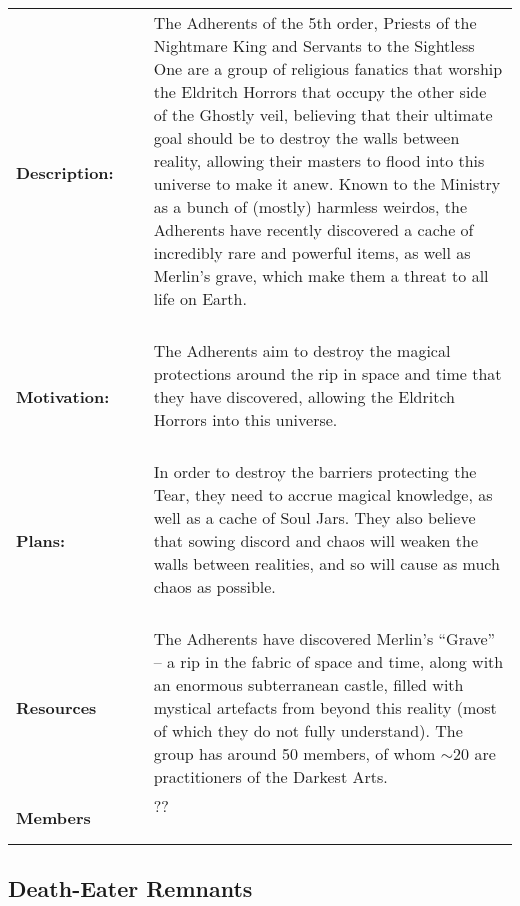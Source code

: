 \documentclass[oneside]{book}
\begin{document}
\begin{longtable}{p{} p{} p{} }

\bf Description: & ~ &\parbox[t]{\q cm}{The Adherents of the 5th order, Priests of the Nightmare King and Servants to the Sightless One are a group of religious fanatics that worship the Eldritch Horrors that occupy the other side of the Ghostly veil, believing that their ultimate goal should be to destroy the walls between reality, allowing their masters to flood into this universe to make it anew. Known to the Ministry as a bunch of (mostly) harmless weirdos, the Adherents have recently discovered a cache of incredibly rare and powerful items, as well as Merlin's grave, which make them a threat to all life on Earth.  \\~  } 
\\
\bf Motivation:	& ~ & \parbox[t]{\q cm}{ The Adherents aim to destroy the magical protections around the rip in space and time that they have discovered, allowing the Eldritch Horrors into this universe.  \\~  } 
\\
\bf Plans:	& ~ & \parbox[t]{\q cm}{In order to destroy the barriers protecting the Tear, they need to accrue magical knowledge, as well as a cache of Soul Jars. They also believe that sowing discord and chaos will weaken the walls between realities, and so will cause as much chaos as possible.\\~  } 
\\
\bf Resources & ~ & \parbox[t]{\q cm}{The Adherents have discovered Merlin's ``Grave'' -- a rip in the fabric of space and time, along with an enormous subterranean castle, filled with mystical artefacts from beyond this reality (most of which they do not fully understand). The group has around 50 members, of whom $\sim$20 are practitioners of the Darkest Arts.  \\ ~ }
\\
\bf Members	& ~ &  \parbox[t]{\q cm}{ ?? \\ ~ }

\end{longtable}
\subsection{Death-Eater Remnants}
\end{document}
